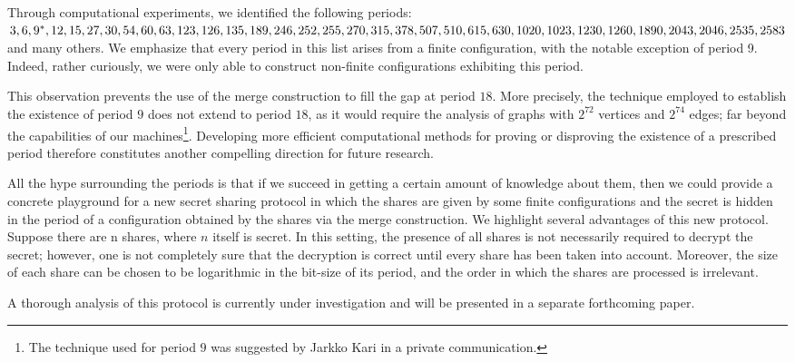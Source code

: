 \documentclass[submission,copyright,creativecommons]{eptcs}
\begin{document}
Through computational experiments, we identified the following periods:
$3, 6, 9^*, 12, 15, 27, 30, 54,\break 60, 63, 123, 126, 135, 189, 246, 252, 255, 270, 315, 378, 507, 510, 615, 630, 1020, 1023, 1230, 1260, 1890,\break 2043, 2046, 2535, 2583$ and many others. We emphasize that every period in this list arises from a finite configuration, with the notable exception of period 9. Indeed, rather curiously, we were only able to construct non-finite configurations exhibiting this period.

This observation prevents the use of the merge construction to fill the gap at period $18$. More precisely, the technique employed to establish the existence of period $9$ does not extend to period $18$, as it would require the analysis of graphs with $2^{72}$ vertices and $2^{74}$ edges; far beyond the capabilities of our machines\footnote{The technique used for period $9$ was suggested by Jarkko Kari in a private communication.}. Developing more efficient computational methods for proving or disproving the existence of a prescribed period therefore constitutes another compelling direction for future research.

All the hype surrounding the periods is that if we succeed in getting a certain amount of knowledge about them, then we could provide a concrete playground for a new secret sharing protocol in which the shares are given by some finite configurations and the secret is hidden in the period of a configuration obtained by the shares via the merge construction.
We highlight several advantages of this new protocol. Suppose there are n shares, where $n$ itself is secret. In this setting, the presence of all shares is not necessarily required to decrypt the secret; however, one is not completely sure that the decryption is correct until every share has been taken into account. Moreover, the size of each share can be chosen to be logarithmic in the bit-size of its period, and the order in which the shares are processed is irrelevant.

A thorough analysis of this protocol is currently under investigation and will be presented in a separate forthcoming paper.


%


%
\end{document}
